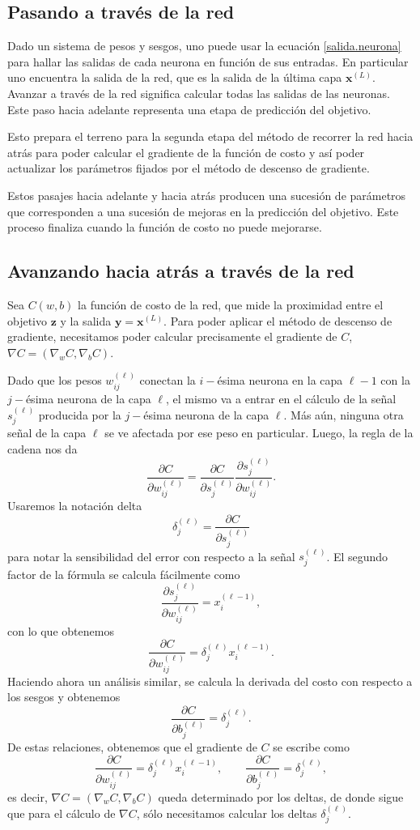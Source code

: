 \documentclass[12pt, a4paper]{amsbook}
\newcommand{\xx}{{\mathbf x}}
\newcommand{\yy}{{\mathbf y}}
\newcommand{\zz}{{\mathbf z}}
\theoremstyle{remark}
\theoremstyle{definition}
\numberwithin{section}{chapter}
\numberwithin{subsection}{section}
\numberwithin{equation}{section}
\numberwithin{figure}{chapter}
\begin{document}
\subsection{Pasando a través de la red} Dado un sistema de pesos y sesgos, uno puede usar la ecuación \eqref{salida.neurona} para hallar las salidas de cada neurona en función de sus entradas. En particular uno encuentra la salida de la red, que es la salida de la última capa $\xx^{(L)}$. Avanzar a través de la red significa calcular todas las salidas de las neuronas. Este paso hacia adelante representa una etapa de predicción del objetivo. 

Esto prepara el terreno para la segunda etapa del método de recorrer la red hacia atrás para poder calcular el gradiente de la función de costo y así poder actualizar los parámetros fijados por el método de descenso de gradiente.

Estos pasajes hacia adelante y hacia atrás producen una sucesión de parámetros que corresponden a una sucesión de mejoras en la predicción del objetivo. Este proceso finaliza cuando la función de costo no puede mejorarse.

\subsection{Avanzando hacia atrás a través de la red}

Sea $C(w, b)$ la función de costo de la red, que mide la proximidad entre el objetivo $\zz$ y la salida $\yy=\xx^{(L)}$. Para poder aplicar el método de descenso de gradiente, necesitamos poder calcular precisamente el gradiente de $C$, $\nabla C = (\nabla_w C, \nabla_b C)$.

Dado que los pesos $w_{ij}^{(\ell)}$ conectan la $i-$ésima neurona en la capa $\ell-1$ con la $j-$ésima neurona de la capa $\ell$, el mismo va a entrar en el cálculo de la señal $s_j^{(\ell)}$ producida por la $j-$ésima neurona de la capa $\ell$. Más aún, ninguna otra señal de la capa $\ell$ se ve afectada por ese peso en particular. Luego, la regla de la cadena nos da
$$
\frac{\partial C}{\partial w_{ij}^{(\ell)}} = \frac{\partial C}{\partial s_j^{(\ell)}} \frac{\partial s_j^{(\ell)}}{\partial w_{ij}^{(\ell)}}.
$$
Usaremos la notación delta
$$
\delta_j^{(\ell)} = \frac{\partial C}{\partial s_j^{(\ell)}} 
$$
para notar la sensibilidad del error con respecto a la señal $s_j^{(\ell)}$. El segundo factor de la fórmula se calcula fácilmente como
$$
\frac{\partial s_j^{(\ell)}}{\partial w_{ij}^{(\ell)}} = x_i^{(\ell -1)},
$$
con lo que obtenemos
$$
\frac{\partial C}{\partial w_{ij}^{(\ell)}} = \delta_j^{(\ell)} x_i^{(\ell -1)}.
$$
Haciendo ahora un análisis similar, se calcula la derivada del costo con respecto a los sesgos y obtenemos
$$
\frac{\partial C}{\partial b_j^{(\ell)}} = \delta_j^{(\ell)}.
$$
De estas relaciones, obtenemos que el gradiente de $C$ se escribe como
$$
\frac{\partial C}{\partial w_{ij}^{(\ell)}}=\delta_j^{(\ell)}x_i^{(\ell -1)},\qquad \frac{\partial C}{\partial b_j^{(\ell)}}=\delta_j^{(\ell)},
$$
es decir, $\nabla C=(\nabla_w C, \nabla_b C)$ queda determinado por los deltas, de donde sigue que para el cálculo de $\nabla C$, sólo necesitamos calcular los deltas $\delta_j^{(\ell)}$.
\end{document}
